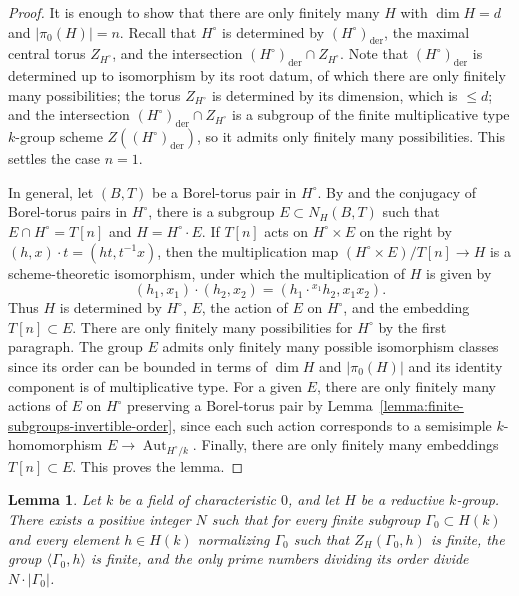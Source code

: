 \documentclass[reqno]{amsart}
\numberwithin{equation}{subsection}
\DeclareMathOperator{\Aut}{Aut}
\DeclareMathOperator{\der}{der}
\newtheorem{lemma}[thm]{Lemma}
\theoremstyle{remark}
\numberwithin{equation}{subsection}
\numberwithin{figure}{subsection}
\begin{document}
\begin{proof}
It is enough to show that there are only finitely many $H$ with $\dim H = d$ and $|\pi_0(H)| = n$. Recall that $H^\circ$ is determined by $(H^\circ)_{\der}$, the maximal central torus $Z_{H^\circ}$, and the intersection $(H^\circ)_{\der} \cap Z_{H^\circ}$. Note that $(H^\circ)_{\der}$ is determined up to isomorphism by its root datum, of which there are only finitely many possibilities; the torus $Z_{H^\circ}$ is determined by its dimension, which is $\leq d$; and the intersection $(H^\circ)_{\der} \cap Z_{H^\circ}$ is a subgroup of the finite multiplicative type $k$-group scheme $Z((H^\circ)_{\der})$, so it admits only finitely many possibilities. This settles the case $n = 1$.

In general, let $(B, T)$ be a Borel-torus pair in $H^\circ$. By \cite[Lemma 3.3]{Cot24} and the conjugacy of Borel-torus pairs in $H^\circ$, there is a subgroup $E \subset N_H(B, T)$ such that $E \cap H^\circ = T[n]$ and $H = H^\circ \cdot E$. If $T[n]$ acts on $H^\circ \times E$ on the right by $(h, x) \cdot t = (ht, t^{-1}x)$, then the multiplication map $(H^\circ \times E)/T[n] \to H$ is a scheme-theoretic isomorphism, under which the multiplication of $H$ is given by
\[
(h_1, x_1) \cdot (h_2, x_2) = (h_1 \cdot {}^{x_1}h_2, x_1x_2).
\]
Thus $H$ is determined by $H^\circ$, $E$, the action of $E$ on $H^\circ$, and the embedding $T[n] \subset E$. There are only finitely many possibilities for $H^\circ$ by the first paragraph. The group $E$ admits only finitely many possible isomorphism classes since its order can be bounded in terms of $\dim H$ and $|\pi_0(H)|$ and its identity component is of multiplicative type. For a given $E$, there are only finitely many actions of $E$ on $H^\circ$ preserving a Borel-torus pair by Lemma~\ref{lemma:finite-subgroups-invertible-order}, since each such action corresponds to a semisimple $k$-homomorphism $E \to \Aut_{H^\circ/k}$. Finally, there are only finitely many embeddings $T[n] \subset E$. This proves the lemma.
\end{proof}

\begin{lemma}\label{lemma:bigger-finiteness-claim}
Let $k$ be a field of characteristic $0$, and let $H$ be a reductive $k$-group. There exists a positive integer $N$ such that for every finite subgroup $\Gamma_0 \subset H(k)$ and every element $h \in H(k)$ normalizing $\Gamma_0$ such that $Z_H(\Gamma_0, h)$ is finite, the group $\langle\Gamma_0, h\rangle$ is finite, and the only prime numbers dividing its order divide $N \cdot |\Gamma_0|$.
\end{lemma}
\end{document}
